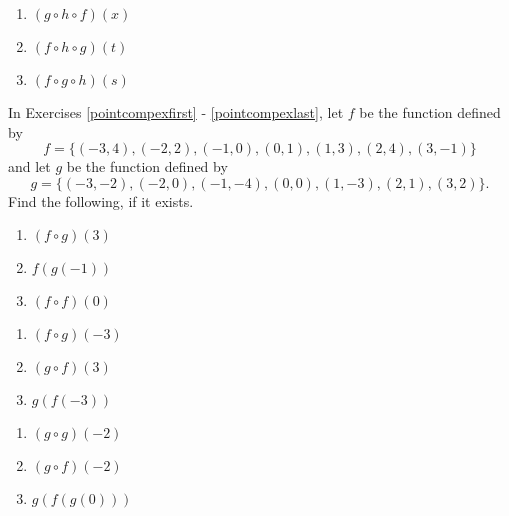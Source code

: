 \begin{multicols}{3}
\begin{enumerate}
\setcounter{enumi}{\value{HW}}

\item $(g\circ h \circ f)(x)$ 

\item $(f\circ h \circ g)(t)$

\item $(f\circ g \circ h)(s)$ \label{threefunccomplast}

\setcounter{HW}{\value{enumi}}
\end{enumerate}
\end{multicols}

In Exercises \ref{pointcompexfirst} - \ref{pointcompexlast}, let $f$ be the function defined by \[f = \{(-3, 4), (-2, 2), (-1, 0), (0, 1), (1, 3), (2, 4), (3, -1)\}\] and let $g$ be the function defined by \[g = \{(-3, -2), (-2, 0), (-1, -4), (0, 0), (1, -3), (2, 1), (3, 2)\}.\]  Find the following, if it exists.

\begin{multicols}{3}
\begin{enumerate}
\setcounter{enumi}{\value{HW}}

\item $(f \circ g)(3)$ \label{pointcompexfirst}
\item $f(g(-1))$
\item $(f \circ f)(0)$

\setcounter{HW}{\value{enumi}}
\end{enumerate}
\end{multicols}

\begin{multicols}{3}
\begin{enumerate}
\setcounter{enumi}{\value{HW}}


\item $(f \circ g)(-3)$
\item $(g \circ f)(3)$
\item $g(f(-3))$


\setcounter{HW}{\value{enumi}}
\end{enumerate}
\end{multicols}

\begin{multicols}{3}
\begin{enumerate}
\setcounter{enumi}{\value{HW}}

\item $(g \circ g)(-2)$
\item $(g \circ f)(-2)$
\item $g(f(g(0)))$


\setcounter{HW}{\value{enumi}}
\end{enumerate}
\end{multicols}

